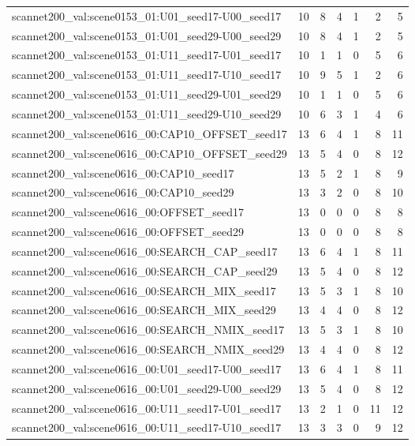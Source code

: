 \begin{table}[t]
\begin{tabular}{lrrrrrr}
scannet200\_val:scene0153\_01:U01\_seed17-U00\_seed17 & 10 & 8 & 4 & 1 & 2 & 5 \\
scannet200\_val:scene0153\_01:U01\_seed29-U00\_seed29 & 10 & 8 & 4 & 1 & 2 & 5 \\
scannet200\_val:scene0153\_01:U11\_seed17-U01\_seed17 & 10 & 1 & 1 & 0 & 5 & 6 \\
scannet200\_val:scene0153\_01:U11\_seed17-U10\_seed17 & 10 & 9 & 5 & 1 & 2 & 6 \\
scannet200\_val:scene0153\_01:U11\_seed29-U01\_seed29 & 10 & 1 & 1 & 0 & 5 & 6 \\
scannet200\_val:scene0153\_01:U11\_seed29-U10\_seed29 & 10 & 6 & 3 & 1 & 4 & 6 \\
scannet200\_val:scene0616\_00:CAP10\_OFFSET\_seed17 & 13 & 6 & 4 & 1 & 8 & 11 \\
scannet200\_val:scene0616\_00:CAP10\_OFFSET\_seed29 & 13 & 5 & 4 & 0 & 8 & 12 \\
scannet200\_val:scene0616\_00:CAP10\_seed17 & 13 & 5 & 2 & 1 & 8 & 9 \\
scannet200\_val:scene0616\_00:CAP10\_seed29 & 13 & 3 & 2 & 0 & 8 & 10 \\
scannet200\_val:scene0616\_00:OFFSET\_seed17 & 13 & 0 & 0 & 0 & 8 & 8 \\
scannet200\_val:scene0616\_00:OFFSET\_seed29 & 13 & 0 & 0 & 0 & 8 & 8 \\
scannet200\_val:scene0616\_00:SEARCH\_CAP\_seed17 & 13 & 6 & 4 & 1 & 8 & 11 \\
scannet200\_val:scene0616\_00:SEARCH\_CAP\_seed29 & 13 & 5 & 4 & 0 & 8 & 12 \\
scannet200\_val:scene0616\_00:SEARCH\_MIX\_seed17 & 13 & 5 & 3 & 1 & 8 & 10 \\
scannet200\_val:scene0616\_00:SEARCH\_MIX\_seed29 & 13 & 4 & 4 & 0 & 8 & 12 \\
scannet200\_val:scene0616\_00:SEARCH\_NMIX\_seed17 & 13 & 5 & 3 & 1 & 8 & 10 \\
scannet200\_val:scene0616\_00:SEARCH\_NMIX\_seed29 & 13 & 4 & 4 & 0 & 8 & 12 \\
scannet200\_val:scene0616\_00:U01\_seed17-U00\_seed17 & 13 & 6 & 4 & 1 & 8 & 11 \\
scannet200\_val:scene0616\_00:U01\_seed29-U00\_seed29 & 13 & 5 & 4 & 0 & 8 & 12 \\
scannet200\_val:scene0616\_00:U11\_seed17-U01\_seed17 & 13 & 2 & 1 & 0 & 11 & 12 \\
scannet200\_val:scene0616\_00:U11\_seed17-U10\_seed17 & 13 & 3 & 3 & 0 & 9 & 12 \\

\end{tabular}
\end{table}
